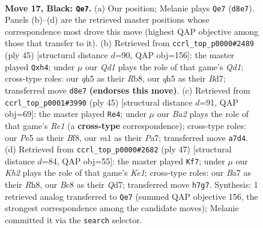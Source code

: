 \documentclass[11pt]{article}
\begin{document}
\clearpage

\begin{figure}[p]\centering
\begin{subfigure}{0.46\textwidth}\centering
\resizebox{\linewidth}{!}{%
\newchessgame
\chessboard[
  setfen={r1bq1r2/b1p2p1k/2p4p/P3p1pQ/4P1P1/2PP4/5P2/RNB2RK1 b - - 0 17},
  showmover=false,
  pgfstyle=straightmove, color=movearrow, markmove={d8-e7}
]}
\caption{}
\end{subfigure}\hfill
\begin{subfigure}{0.46\textwidth}\centering
\resizebox{\linewidth}{!}{%
\newchessgame
\chessboard[
  setfen={1r1q1r1k/3b1p1p/3p2pb/1P1Qp3/RN2P2P/8/4BPP1/5RK1 b - - 1 23},
  showmover=false,
  pgfstyle=straightmove, color=movearrow, markmove={d8-h4}
]}
\caption{}
\end{subfigure}
\\[4pt]
\begin{subfigure}{0.46\textwidth}\centering
\resizebox{\linewidth}{!}{%
\newchessgame
\chessboard[
  setfen={2rqrbk1/p2n1pp1/2p5/3p1Q1P/N5p1/2B3P1/PP2PP2/2RR2K1 b - - 0 23},
  showmover=false,
  pgfstyle=straightmove, color=movearrow, markmove={e8-e4}
]}
\caption{}
\end{subfigure}\hfill
\begin{subfigure}{0.46\textwidth}\centering
\resizebox{\linewidth}{!}{%
\newchessgame
\chessboard[
  setfen={r3k2r/pp1qb1pb/2p4p/7P/PP4P1/2N1QP2/6K1/R1B4R b - - 1 24},
  showmover=false,
  pgfstyle=straightmove, color=movearrow, markmove={e8-f7}
]}
\caption{}
\end{subfigure}
\caption{\textbf{Move 17, Black: \texttt{Qe7}.} (a) Our position; Melanie plays \texttt{Qe7} (\texttt{d8e7}). Panels (b)--(d) are the retrieved master positions whose correspondence most drove this move (highest QAP objective among those that transfer to it). (b) Retrieved from \texttt{ccrl\_top\_p0000\#2489} (ply 45) [structural distance $d$=90, QAP obj=156]: the master played \texttt{Qxh4}; under $\mu$ our \emph{Qd1} plays the role of that game's \emph{Qd1}; cross-type roles: our \emph{q}h5 as their \emph{R}b8, our \emph{q}h5 as their \emph{B}d7; transferred move \texttt{d8e7} \textbf{(endorses this move)}. (c) Retrieved from \texttt{ccrl\_top\_p0001\#3990} (ply 45) [structural distance $d$=91, QAP obj=69]: the master played \texttt{Re4}; under $\mu$ our \emph{Ba2} plays the role of that game's \emph{Re1} (a \textbf{cross-type} correspondence); cross-type roles: our \emph{P}e5 as their \emph{B}f8, our \emph{r}a1 as their \emph{P}a7; transferred move \texttt{a7d4}. (d) Retrieved from \texttt{ccrl\_top\_p0000\#2682} (ply 47) [structural distance $d$=84, QAP obj=55]: the master played \texttt{Kf7}; under $\mu$ our \emph{Kh2} plays the role of that game's \emph{Ke1}; cross-type roles: our \emph{B}a7 as their \emph{R}h8, our \emph{B}c8 as their \emph{Q}d7; transferred move \texttt{h7g7}. Synthesis: 1 retrieved analog transferred to \texttt{Qe7} (summed QAP objective 156, the strongest correspondence among the candidate moves); Melanie committed it via the \texttt{search} selector.}
\label{fig:thought-m33}
\end{figure}
\end{document}
